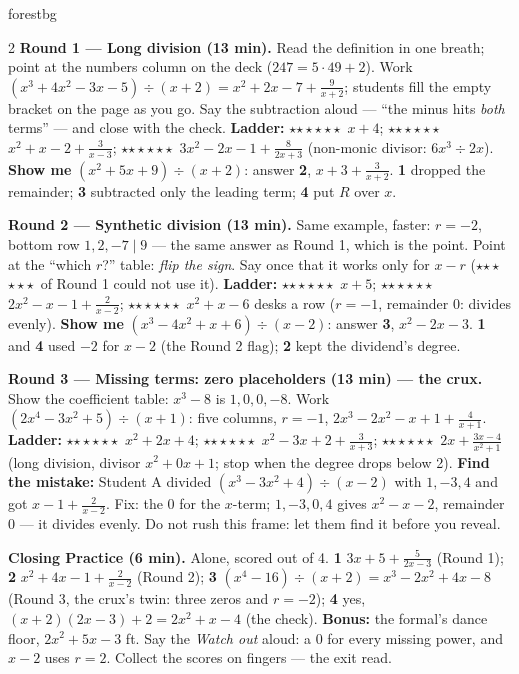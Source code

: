 \documentclass[10pt]{article}
\newcommand{\rung}[1]{{\color{goldacc}\ifcase#1\or$\star$\or$\star\star$\or$\star\star\star$\fi}}
\begin{document}
\boxguard
\begin{skillbox}{forestbg}
\begin{multicols}{2}
\textbf{Round 1 --- Long division (13 min).} Read the definition in one breath; point at the
numbers column on the deck ($247 = 5\cdot49 + 2$). Work $(x^3 + 4x^2 - 3x - 5) \div (x + 2) =
x^2 + 2x - 7 + \frac{9}{x+2}$; students fill the empty bracket on the page as you go. Say the
subtraction aloud --- ``the minus hits \emph{both} terms'' --- and close with the check.
\textbf{Ladder:} \rung1\ $x + 4$; \rung2\ $x^2 + x - 2 + \frac{3}{x-3}$; \rung3\ $3x^2 - 2x - 1 +
\frac{8}{2x+3}$ (non-monic divisor: $6x^3 \div 2x$). \textbf{Show me}
$(x^2 + 5x + 9) \div (x + 2)$: answer \textbf{2}, $x + 3 + \frac{3}{x+2}$. \textbf{1} dropped the
remainder; \textbf{3} subtracted only the leading term; \textbf{4} put $R$ over $x$.

\textbf{Round 2 --- Synthetic division (13 min).} Same example, faster: $r = -2$, bottom row
$1, 2, -7 \mid 9$ --- the same answer as Round 1, which is the point. Point at the ``which
$r$?'' table: \emph{flip the sign}. Say once that it works only for $x - r$ (\rung3\ of Round 1
could not use it). \textbf{Ladder:} \rung1\ $x + 5$; \rung2\ $2x^2 - x - 1 + \frac{2}{x-2}$;
\rung3\ $x^2 + x - 6$ desks a row ($r = -1$, remainder $0$: divides evenly). \textbf{Show me}
$(x^3 - 4x^2 + x + 6) \div (x - 2)$: answer \textbf{3}, $x^2 - 2x - 3$. \textbf{1} and
\textbf{4} used $-2$ for $x - 2$ (the Round 2 flag); \textbf{2} kept the dividend's degree.

\columnbreak
\textbf{Round 3 --- Missing terms: zero placeholders (13 min) --- the crux.} Show the
coefficient table: $x^3 - 8$ is $1, 0, 0, -8$. Work $(2x^4 - 3x^2 + 5) \div (x + 1)$: five
columns, $r = -1$, $2x^3 - 2x^2 - x + 1 + \frac{4}{x+1}$. \textbf{Ladder:} \rung1\ $x^2 + 2x + 4$;
\rung2\ $x^2 - 3x + 2 + \frac{3}{x+3}$; \rung3\ $2x + \frac{3x - 4}{x^2 + 1}$ (long division,
divisor $x^2 + 0x + 1$; stop when the degree drops below 2). \textbf{Find the mistake:} Student A
divided $(x^3 - 3x^2 + 4) \div (x - 2)$ with $1, -3, 4$ and got $x - 1 + \frac{2}{x-2}$. Fix: the
$0$ for the $x$-term; $1, -3, 0, 4$ gives $x^2 - x - 2$, remainder $0$ --- it divides evenly.
Do not rush this frame: let them find it before you reveal.

\textbf{Closing Practice (6 min).} Alone, scored out of 4. \textbf{1} $3x + 5 + \frac{5}{2x-3}$
(Round 1); \textbf{2} $x^2 + 4x - 1 + \frac{2}{x-2}$ (Round 2); \textbf{3} $(x^4 - 16) \div (x +
2) = x^3 - 2x^2 + 4x - 8$ (Round 3, the crux's twin: three zeros and $r = -2$); \textbf{4} yes,
$(x + 2)(2x - 3) + 2 = 2x^2 + x - 4$ (the check). \textbf{Bonus:} the formal's dance floor,
$2x^2 + 5x - 3$ ft. Say the \emph{Watch out} aloud: a $0$ for every missing power, and $x - 2$
uses $r = 2$. Collect the scores on fingers --- the exit read.
\end{multicols}
\end{skillbox}
\end{document}
